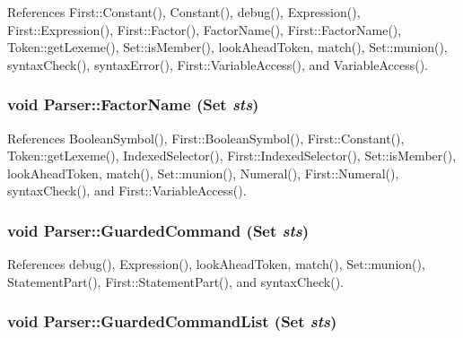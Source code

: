 References First::Constant(), Constant(), debug(), Expression(), First::Expression(), First::Factor(), FactorName(), First::FactorName(), Token::getLexeme(), Set::isMember(), lookAheadToken, match(), Set::munion(), syntaxCheck(), syntaxError(), First::VariableAccess(), and VariableAccess().

\hypertarget{classParser_a3eeedadd101b70aef097d1ef8f5f8974}{
\subsubsection[{FactorName}]{\setlength{\rightskip}{0pt plus 5cm}void Parser::FactorName ({\bf Set} {\em sts})}}
\label{classParser_a3eeedadd101b70aef097d1ef8f5f8974}


References BooleanSymbol(), First::BooleanSymbol(), First::Constant(), Token::getLexeme(), IndexedSelector(), First::IndexedSelector(), Set::isMember(), lookAheadToken, match(), Set::munion(), Numeral(), First::Numeral(), syntaxCheck(), and First::VariableAccess().

\hypertarget{classParser_ab9dbadf49595360da28b8cc77ddec8e7}{
\subsubsection[{GuardedCommand}]{\setlength{\rightskip}{0pt plus 5cm}void Parser::GuardedCommand ({\bf Set} {\em sts})}}
\label{classParser_ab9dbadf49595360da28b8cc77ddec8e7}


References debug(), Expression(), lookAheadToken, match(), Set::munion(), StatementPart(), First::StatementPart(), and syntaxCheck().

\hypertarget{classParser_a00618d906669f1d0908961dc6c6c51e0}{
\subsubsection[{GuardedCommandList}]{\setlength{\rightskip}{0pt plus 5cm}void Parser::GuardedCommandList ({\bf Set} {\em sts})}}
\label{classParser_a00618d906669f1d0908961dc6c6c51e0}


